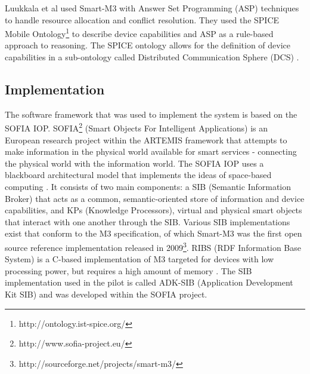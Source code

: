 
Luukkala et al \cite{Luukkala2010} used Smart-M3 with Answer Set Programming (ASP) techniques to handle resource allocation and conflict resolution. They used the SPICE Mobile Ontology\footnote{http://ontology.ist-spice.org/} to describe device capabilities and ASP as a rule-based approach to reasoning. The SPICE ontology allows for the definition of device capabilities in a sub-ontology called Distributed Communication Sphere (DCS) \cite{Villalonga2009}. %


\subsection{Implementation}
\label{implementation}

The software framework that was used to implement the system is based on the SOFIA IOP. SOFIA\footnote{http://www.sofia-project.eu/} (Smart Objects For Intelligent Applications) is an European research project within the ARTEMIS framework that attempts to make information in the physical world available for smart services - connecting the physical world with the information world. The SOFIA IOP uses a blackboard architectural model that implements the ideas of space-based computing \cite{Honkola2010}. It consists of two main components: a SIB (Semantic Information Broker) that acts as a common, semantic-oriented store of information and device capabilities, and KPs (Knowledge Processors), virtual and physical smart objects that interact with one another through the SIB. Various SIB implementations exist that conform to the M3 specification, of which Smart-M3 was the first open source reference implementation released in 2009\footnote{http://sourceforge.net/projects/smart-m3/}. RIBS (RDF Information Base System) is a C-based implementation of M3 targeted for devices with low processing power, but requires a high amount of memory \cite{Etelapera2011}.  The SIB implementation used in the pilot is called ADK-SIB (Application Development Kit SIB) and was developed within the SOFIA project. 

